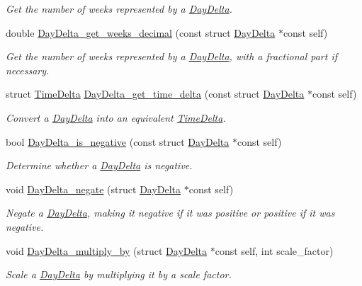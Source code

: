 \begin{DoxyCompactItemize}
\begin{DoxyCompactList}\small\item\em \-Get the number of weeks represented by a \hyperlink{structDayDelta}{\-Day\-Delta}. \end{DoxyCompactList}\item 
double \hyperlink{day-delta_8h_a62efa797217bb961a560f07cf25d4462}{\-Day\-Delta\-\_\-get\-\_\-weeks\-\_\-decimal} (const struct \hyperlink{structDayDelta}{\-Day\-Delta} $\ast$const self)
\begin{DoxyCompactList}\small\item\em \-Get the number of weeks represented by a \hyperlink{structDayDelta}{\-Day\-Delta}, with a fractional part if necessary. \end{DoxyCompactList}\item 
struct \hyperlink{structTimeDelta}{\-Time\-Delta} \hyperlink{day-delta_8h_a62765dd1d10d3358a5b41469ef9520a6}{\-Day\-Delta\-\_\-get\-\_\-time\-\_\-delta} (const struct \hyperlink{structDayDelta}{\-Day\-Delta} $\ast$const self)
\begin{DoxyCompactList}\small\item\em \-Convert a \hyperlink{structDayDelta}{\-Day\-Delta} into an equivalent \hyperlink{structTimeDelta}{\-Time\-Delta}. \end{DoxyCompactList}\item 
bool \hyperlink{day-delta_8h_a4b104966e921d8b90ce0c1094861b9b2}{\-Day\-Delta\-\_\-is\-\_\-negative} (const struct \hyperlink{structDayDelta}{\-Day\-Delta} $\ast$const self)
\begin{DoxyCompactList}\small\item\em \-Determine whether a \hyperlink{structDayDelta}{\-Day\-Delta} is negative. \end{DoxyCompactList}\item 
void \hyperlink{day-delta_8h_a9deb74bc8d748a21449a16e658f16432}{\-Day\-Delta\-\_\-negate} (struct \hyperlink{structDayDelta}{\-Day\-Delta} $\ast$const self)
\begin{DoxyCompactList}\small\item\em \-Negate a \hyperlink{structDayDelta}{\-Day\-Delta}, making it negative if it was positive or positive if it was negative. \end{DoxyCompactList}\item 
void \hyperlink{day-delta_8h_af8c4a730c36c38da48ba2d6df982c167}{\-Day\-Delta\-\_\-multiply\-\_\-by} (struct \hyperlink{structDayDelta}{\-Day\-Delta} $\ast$const self, int scale\-\_\-factor)
\begin{DoxyCompactList}\small\item\em \-Scale a \hyperlink{structDayDelta}{\-Day\-Delta} by multiplying it by a scale factor. \end{DoxyCompactList}\item 

\end{DoxyCompactItemize}
